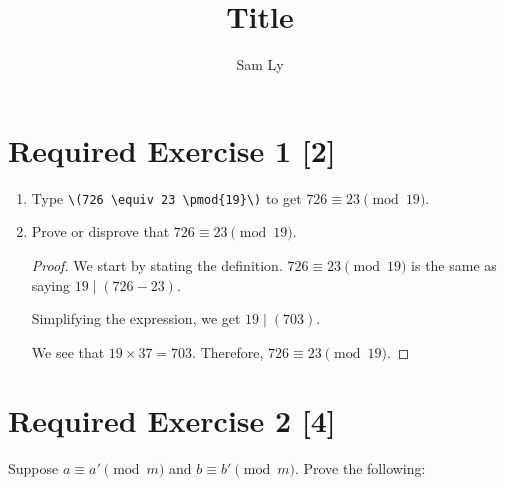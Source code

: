 \documentclass{article}
\title{Title}
\author{Sam Ly}
\begin{document}
\maketitle

\section*{Required Exercise 1 [2]}

\begin{enumerate}
    \item {
        Type \verb|\(726 \equiv 23 \pmod{19}\)| to get 
        \(726 \equiv 23 \pmod{19}\).
    }
    \item {
        Prove or disprove that 
        \(726 \equiv 23 \pmod{19}\).

        \begin{proof}
            We start by stating the definition. \(726 \equiv 23 \pmod{19}\) is 
            the same as saying \(19 \mid (726 - 23)\).

            Simplifying the expression, we get \(19 \mid (703)\).

            We see that \(19 \times 37 = 703\). Therefore, \(726 \equiv 23 \pmod{19}\).
        \end{proof}
    }
\end{enumerate}

\section*{Required Exercise 2 [4]}

Suppose \(a \equiv a' \pmod{m}\) and \(b \equiv b' \pmod{m}\). Prove the
following:
\end{document}

